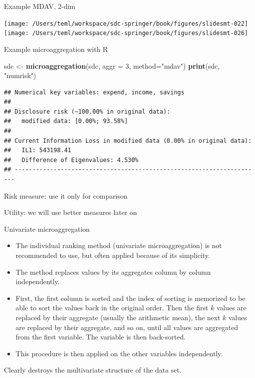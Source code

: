 \documentclass[ignorenonframetext,]{beamer}
\newenvironment{Shaded}{\begin{snugshade}}{\end{snugshade}}
\newcommand{\DataTypeTok}[1]{\textcolor[rgb]{0.13,0.29,0.53}{#1}}
\newcommand{\DecValTok}[1]{\textcolor[rgb]{0.00,0.00,0.81}{#1}}
\newcommand{\KeywordTok}[1]{\textcolor[rgb]{0.13,0.29,0.53}{\textbf{#1}}}
\newcommand{\NormalTok}[1]{#1}
\newcommand{\StringTok}[1]{\textcolor[rgb]{0.31,0.60,0.02}{#1}}
\providecommand{\tightlist}{%
  \setlength{\itemsep}{0pt}\setlength{\parskip}{0pt}}
\begin{document}
\begin{frame}{Example MDAV, 2-dim}
\protect\hypertarget{example-mdav-2-dim-2}{}

\texttt{[image: /Users/teml/workspace/sdc-springer/book/figures/slidesmt-022]}
\texttt{[image: /Users/teml/workspace/sdc-springer/book/figures/slidesmt-026]}

\end{frame}

\begin{frame}[fragile]{Example microaggregation with R}
\protect\hypertarget{example-microaggregation-with-r}{}

\begin{Shaded}
\begin{Highlighting}[]
\NormalTok{sdc <-}\StringTok{ }\KeywordTok{microaggregation}\NormalTok{(sdc, }\DataTypeTok{aggr =} \DecValTok{3}\NormalTok{, }\DataTypeTok{method=}\StringTok{"mdav"}\NormalTok{)}
\KeywordTok{print}\NormalTok{(sdc, }\StringTok{"numrisk"}\NormalTok{)}
\end{Highlighting}
\end{Shaded}

\begin{verbatim}
## Numerical key variables: expend, income, savings
## 
## Disclosure risk (~100.00% in original data):
##   modified data: [0.00%; 93.58%]
## 
## Current Information Loss in modified data (0.00% in original data):
##   IL1: 543198.41
##   Difference of Eigenvalues: 4.530%
## ----------------------------------------------------------------------
\end{verbatim}

Risk measure: use it only for comparison

Utility: we will use better measures later on

\end{frame}

\begin{frame}{Univariate microaggregation}
\protect\hypertarget{univariate-microaggregation}{}

\begin{itemize}
\tightlist
\item
  The individual ranking method (univariate microaggregation) is not
  recommended to use, but often applied because of its simplicity.
\item
  The method replaces values by its aggregates column by column
  independently.
\item
  First, the first column is sorted and the index of sorting is
  memorized to be able to sort the values back in the original order.
  Then the first \(k\) values are replaced by their aggregate (usually
  the arithmetic mean), the next \(k\) values are replaced by their
  aggregate, and so on, until all values are aggregated from the first
  variable. The variable is then back-sorted.
\item
  This procedure is then applied on the other variables independently.
\end{itemize}

Clearly destroys the multivariate structure of the data set.

\end{frame}
\end{document}
